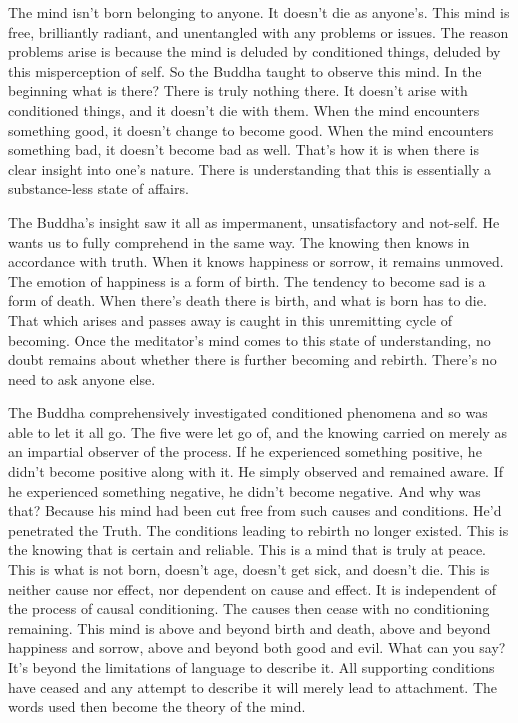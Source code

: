 The mind isn't born belonging to anyone. It doesn't die as anyone's. This mind is free, brilliantly radiant, and unentangled with any problems or issues. The reason problems arise is because the mind is deluded by conditioned things, deluded by this misperception of self. So the Buddha taught to observe this mind. In the beginning what is there? There is truly nothing there. It doesn't arise with conditioned things, and it doesn't die with them. When the mind encounters something good, it doesn't change to become good. When the mind encounters something bad, it doesn't become bad as well. That's how it is when there is clear insight into one's nature. There is understanding that this is essentially a substance-less state of affairs.

The Buddha's insight saw it all as impermanent, unsatisfactory and not-self. He wants us to fully comprehend in the same way. The knowing then knows in accordance with truth. When it knows happiness or sorrow, it remains unmoved. The emotion of happiness is a form of birth. The tendency to become sad is a form of death. When there's death there is birth, and what is born has to die. That which arises and passes away is caught in this unremitting cycle of becoming. Once the meditator's mind comes to this state of understanding, no doubt remains about whether there is further becoming and rebirth. There's no need to ask anyone else. 

The Buddha comprehensively investigated conditioned phenomena and so was able to let it all go. The five  were let go of, and the knowing carried on merely as an impartial observer of the process. If he experienced something positive, he didn't become positive along with it. He simply observed and remained aware. If he experienced something negative, he didn't become negative. And why was that? Because his mind had been cut free from such causes and conditions. He'd penetrated the Truth. The conditions leading to rebirth no longer existed. This is the knowing that is certain and reliable. This is a mind that is truly at peace. This is what is not born, doesn't age, doesn't get sick, and doesn't die. This is neither cause nor effect, nor dependent on cause and effect. It is independent of the process of causal conditioning. The causes then cease with no conditioning remaining. This mind is above and beyond birth and death, above and beyond happiness and sorrow, above and beyond both good and evil. What can you say? It's beyond the limitations of language to describe it. All supporting conditions have ceased and any attempt to describe it will merely lead to attachment. The words used then become the theory of the mind.

